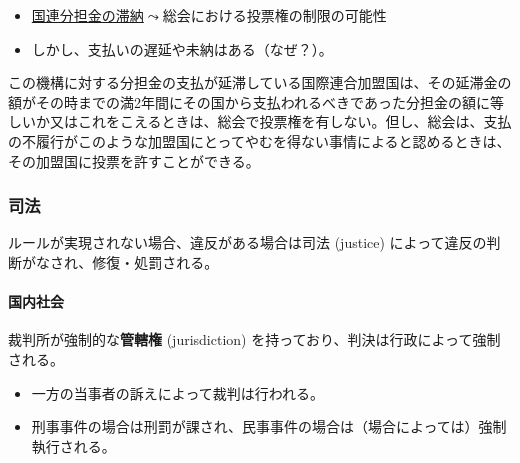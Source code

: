 \documentclass[
  xelatex,
  ja=standard]{bxjsarticle}
\let\oldparagraph\paragraph
\renewcommand{\paragraph}[1]{\oldparagraph{#1}\mbox{}}
\providecommand{\tightlist}{%
  \setlength{\itemsep}{0pt}\setlength{\parskip}{0pt}}\usepackage{longtable,booktabs,array}
\begin{document}
\begin{itemize}
\tightlist
\item
  \href{https://www.un.org/en/ga/contributions/honourroll.shtml}{国連分担金の滞納}\(\leadsto\)総会における投票権の制限の可能性
\item
  しかし、支払いの遅延や未納はある（なぜ？）。
\end{itemize}

\begin{tcolorbox}[enhanced jigsaw, titlerule=0mm, colback=white, coltitle=black, title=\textcolor{quarto-callout-note-color}{\faInfo}\hspace{0.5em}{\href{https://www.unic.or.jp/info/un/charter/text_japanese/}{国連憲章}　第19条}, leftrule=.75mm, bottomrule=.15mm, left=2mm, arc=.35mm, breakable, colbacktitle=quarto-callout-note-color!10!white, toprule=.15mm, rightrule=.15mm, opacityback=0, bottomtitle=1mm, colframe=quarto-callout-note-color-frame, toptitle=1mm, opacitybacktitle=0.6]

この機構に対する分担金の支払が延滞している国際連合加盟国は、その延滞金の額がその時までの満2年間にその国から支払われるべきであった分担金の額に等しいか又はこれをこえるときは、総会で投票権を有しない。但し、総会は、支払の不履行がこのような加盟国にとってやむを得ない事情によると認めるときは、その加盟国に投票を許すことができる。

\end{tcolorbox}

\hypertarget{ux53f8ux6cd5}{%
\subsubsection{司法}\label{ux53f8ux6cd5}}

ルールが実現されない場合、違反がある場合は司法 (justice)
によって違反の判断がなされ、修復・処罰される。

\hypertarget{ux56fdux5185ux793eux4f1a-2}{%
\paragraph{国内社会}\label{ux56fdux5185ux793eux4f1a-2}}

裁判所が強制的な\textbf{管轄権} (jurisdiction)
を持っており、判決は行政によって強制される。

\begin{itemize}
\tightlist
\item
  一方の当事者の訴えによって裁判は行われる。
\item
  刑事事件の場合は刑罰が課され、民事事件の場合は（場合によっては）強制執行される。
\end{itemize}
\end{document}
